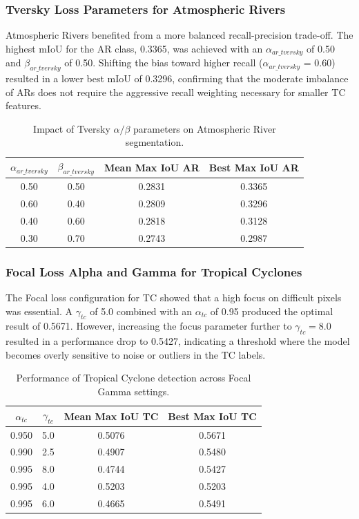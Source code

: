\subsubsection{Tversky Loss Parameters for Atmospheric Rivers}
Atmospheric Rivers benefited from a more balanced recall-precision trade-off. The highest mIoU for the AR class, 0.3365, was achieved with an $\alpha_{ar\_tversky}$ of 0.50 and $\beta_{ar\_tversky}$ of 0.50. Shifting the bias toward higher recall ($\alpha_{ar\_tversky}$ = 0.60) resulted in a lower best mIoU of 0.3296, confirming that the moderate imbalance of ARs does not require the aggressive recall weighting necessary for smaller TC features.

\begin{table}[h]
\centering
\begin{tabular}{@{}cccc@{}}
\toprule
$\alpha_{ar\_tversky}$ & $\beta_{ar\_tversky}$ & Mean Max IoU AR& Best Max IoU AR\\ \midrule
0.50 & 0.50 & 0.2831 & 0.3365 \\
0.60 & 0.40 & 0.2809 & 0.3296 \\
0.40 & 0.60 & 0.2818 & 0.3128 \\
0.30 & 0.70 & 0.2743 & 0.2987 \\ \bottomrule
\end{tabular}
\caption{Impact of Tversky $\alpha/\beta$ parameters on Atmospheric River segmentation.}
\end{table}

\subsubsection{Focal Loss Alpha and Gamma for Tropical Cyclones}
The Focal loss configuration for TC showed that a high focus on difficult pixels was essential. A $\gamma_{tc}$ of 5.0 combined with an $\alpha_{tc}$ of 0.95 produced the optimal result of 0.5671. However, increasing the focus parameter further to $\gamma_{tc} = 8.0$ resulted in a performance drop to 0.5427, indicating a threshold where the model becomes overly sensitive to noise or outliers in the TC labels.

\begin{table}[h]
\centering
\begin{tabular}{@{}cccc@{}}
\toprule
$\alpha_{tc}$ & $\gamma_{tc}$ & Mean Max IoU TC& Best Max IoU TC\\ \midrule
0.950 & 5.0 & 0.5076 & 0.5671 \\
0.990 & 2.5 & 0.4907 & 0.5480 \\
0.995 & 8.0 & 0.4744 & 0.5427 \\
0.995 & 4.0 & 0.5203 & 0.5203 \\
0.995 & 6.0 & 0.4665 & 0.5491 \\ \bottomrule
\end{tabular}
\caption{Performance of Tropical Cyclone detection across Focal Gamma settings.}
\end{table}

